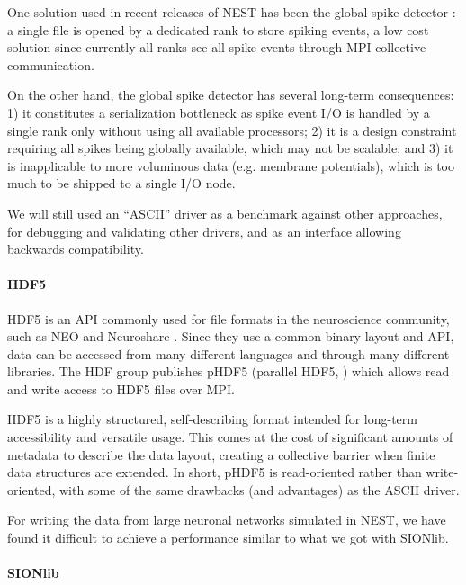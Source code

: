 \documentclass[]{YIC2015}
\begin{document}

One solution used in recent releases of NEST has been the global spike
detector \cite{gsd}: a single file is opened by a dedicated rank to
store spiking events, a low cost solution since currently all ranks
see all spike events through MPI collective communication.

On the other hand, the global spike detector has several long-term
consequences: 1) it constitutes a serialization bottleneck as spike
event I/O is handled by a single rank only without using all available
processors; 2) it is a design constraint requiring all spikes being
globally available, which may not be scalable; and 3) it is
inapplicable to more voluminous data (e.g. membrane potentials), which
is too much to be shipped to a single I/O node.

We will still used an ``ASCII'' driver as a benchmark against other
approaches, for debugging and validating other drivers, and as an
interface allowing backwards compatibility.

\paragraph{HDF5}

HDF5 is an API commonly used for file formats in the neuroscience
community, such as NEO \cite{neo} and Neuroshare \cite{neuroshare}.
Since they use a common binary layout and API, data can be accessed
from many different languages and through many different libraries.
The HDF group publishes pHDF5 (parallel HDF5, \cite{hdf5}) which
allows read and write access to HDF5 files over MPI.

HDF5 is a highly structured, self-describing format intended for
long-term accessibility and versatile usage. This comes at the cost of
significant amounts of metadata to describe the data layout, creating
a collective barrier when finite data structures are extended. In
short, pHDF5 is read-oriented rather than write-oriented, with some of
the same drawbacks (and advantages) as the ASCII driver.

For writing the data from large neuronal networks simulated in NEST,
we have found it difficult to achieve a performance similar to what we
got with SIONlib.

\paragraph{SIONlib}
\end{document}
